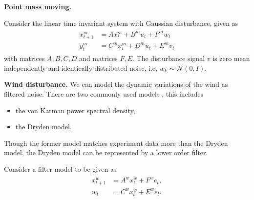 \documentclass{ifacconf}
\begin{document}
\noindent\textbf{Point mass moving.}
    
Consider the linear time invariant system with Gaussian disturbance, given as 
\begin{align}\begin{aligned}
	x^m_{t+1} &= A x^m_{t}+B^mu_{t}+ F^m w_{t}\\
	y^m_{t}&=C^m x^m_{t}+D^m u_{t}+E^m v_{t}\end{aligned}
\end{align}
with matrices $A,B,C,D$ and matrices $F,E$. 
The disturbance signal $v$ is zero mean independently and identically  distributed noise, i.e, $w_k\sim \mathcal{N}(0,I)$.

 
 \noindent\textbf{Wind disturbance.}
We can model the dynamic variations of the wind as filtered noise. 
There are two commonly used models  \citep{richardson2013quantifying},  this includes
\begin{itemize}
	\item the von Karman power spectral density,
	\item the Dryden model.
\end{itemize}
 
 Though the former model matches experiment data more than the 
 Dryden model, the Dryden model can be represented by  a lower order filter.
 
Consider a filter model to be given as
\begin{align}
	\begin{aligned}
	x_{t+1}^w &= A^w x_{t}^w+ F^w e_{t},\\
	w_{t}&=C^w x_{t}^w+E^w e_{t}.
	\end{aligned}
\end{align}
\end{document}
